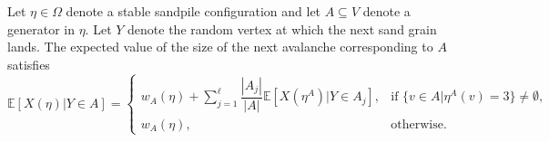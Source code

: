 \documentclass{article}
\begin{document}
\begin{lemma}\label{exp_av_size_rec_thm}
  Let $\eta \in \Omega$ denote a stable sandpile configuration and let $A \subseteq V$ denote a generator in $\eta$. Let $Y$ denote the random vertex at which the next sand grain lands. The expected value of the size of the next avalanche corresponding to $A$ satisfies
  \begin{equation}\label{exp_av_size_rec_eq}
      \mathbb{E}[X(\eta)|Y \in A] = \begin{cases}
          w_A(\eta) + \sum\limits_{j=1}^{\ell} \dfrac{|A_j|}{|A|} \mathbb{E}[X(\eta^A)|Y \in A_j], &\text{if } \{v \in A|\eta^A(v) = 3\} \neq \emptyset, \\
          w_A(\eta), &\text{otherwise}. 
      \end{cases}
  \end{equation}
\end{lemma}
\end{document}
